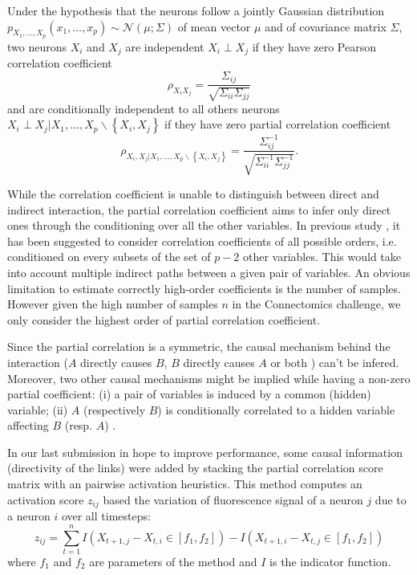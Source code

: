 \documentclass[wcp]{jmlr}
\begin{document}
Under the hypothesis that the neurons follow a jointly Gaussian distribution
$p_{X_1,\ldots,X_p}(x_1,\ldots,x_p) \sim \mathcal{N}(\mu; \Sigma)$
of mean vector $\mu$ and of covariance matrix $\Sigma$, two neurons $X_i$
and $X_j$ are independent $X_i \perp X_j$ if they have zero Pearson correlation
coefficient
\[
\rho_{X_iX_j} = \frac{\Sigma_{ij}}{\sqrt{\Sigma_{ii} \Sigma_{jj}}}
\]
and are conditionally independent to all others neurons
$X_i \perp X_j | X_1,\ldots,X_p \backslash \left\{X_i, X_j\right\}$ if they
have zero partial correlation coefficient
\[
\rho_{X_i, X_j | X_1,\ldots,X_p \backslash \left\{X_i, X_j\right\}} =
\frac{\Sigma^{-1}_{ij}}{\sqrt{\Sigma^{-1}_{ii} \Sigma^{-1}_{jj}}}.
\]

While the correlation coefficient is unable to distinguish between
direct and indirect interaction, the partial correlation coefficient
aims to infer only direct ones through the conditioning over all the other
variables. In previous study \cite{shipley2002cause}, it has been suggested to
consider correlation coefficients of all possible orders,
i.e. conditioned on every subsets of the set of $p-2$ other variables. This
would take into account multiple indirect paths between a given pair of
variables. An obvious limitation to estimate correctly high-order coefficients
is the number of samples. However given the high number of samples $n$
in the Connectomics challenge, we only consider the highest order of partial
correlation coefficient.

Since the partial correlation is a symmetric, the causal mechanism behind the
interaction ($A$ directly causes $B$, $B$ directly causes $A$ or both ) can't
be infered. Moreover, two other causal mechanisms might be implied while having
a non-zero partial coefficient: (i) a pair of variables is induced by a
common (hidden) variable; (ii) $A$ (respectively $B$) is conditionally
correlated to a hidden variable affecting $B$ (resp. $A$)
\cite{de2004discovery}.

In our last submission in hope to improve performance, some causal information
(directivity of the links) were added by stacking the partial correlation score
matrix with an pairwise activation heuristics. This method computes an
activation score $z_{ij}$ based the variation of fluorescence signal of a neuron
$j$ due to a neuron $i$ over all timesteps:
\[
z_{ij} = \sum_{t=1}^n I(X_{t+1,j} - X_{t, i} \in [f_1, f_2]) -  I(X_{t+1,i} - X_{t, j} \in [f_1, f_2])
\]
where $f_1$ and $f_2$ are parameters of the method and $I$ is the
indicator function.
\end{document}
